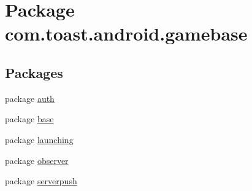 \hypertarget{namespacecom_1_1toast_1_1android_1_1gamebase}{}\section{Package com.\+toast.\+android.\+gamebase}
\label{namespacecom_1_1toast_1_1android_1_1gamebase}
\subsection*{Packages}
\begin{DoxyCompactItemize}
\item 
package \hyperlink{namespacecom_1_1toast_1_1android_1_1gamebase_1_1auth}{auth}
\item 
package \hyperlink{namespacecom_1_1toast_1_1android_1_1gamebase_1_1base}{base}
\item 
package \hyperlink{namespacecom_1_1toast_1_1android_1_1gamebase_1_1launching}{launching}
\item 
package \hyperlink{namespacecom_1_1toast_1_1android_1_1gamebase_1_1observer}{observer}
\item 
package \hyperlink{namespacecom_1_1toast_1_1android_1_1gamebase_1_1serverpush}{serverpush}
\end{DoxyCompactItemize}
